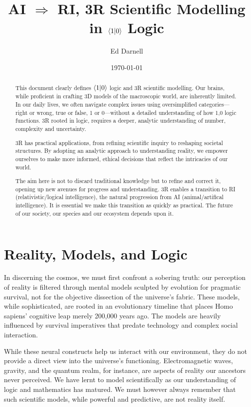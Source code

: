 \documentclass[12pt]{article}
\title{AI \(\Rightarrow\) RI, 3R Scientific Modelling in \(\langle 1 | 0 \rangle\) Logic}
\author{Ed Darnell}
\date{\today}
\begin{document}
\maketitle
\begin{abstract}
    This document clearly defines \(\langle 1 | 0 \rangle\) logic and 3R scientific modelling. Our brains, while proficient in crafting 3D models of the macroscopic world, are inherently limited. In our daily lives, we often navigate complex issues using oversimplified categories—right or wrong, true or false, 1 or 0—without a detailed understanding of how 1,0 logic functions. 3R rooted in \qbit{} logic, requires a deeper, analytic understanding of number, complexity and uncertainty.

    3R has practical applications, from refining scientific inquiry to reshaping societal structures. By adopting an analytic approach to understanding reality, we empower ourselves to make more informed, ethical decisions that reflect the intricacies of our world.

    The aim here is not to discard traditional knowledge but to refine and correct it, opening up new avenues for progress and understanding. 3R enables a transition to RI (relativistic/logical intelligence), the natural progression from AI (animal/artifical intelligence). It is essential we make this transition as quickly as practical. The future of our society, our species and our ecosystem depends upon it.
\end{abstract}
\section*{Reality, Models, and Logic}
In discerning the cosmos, we must first confront a sobering truth: our perception of reality is filtered through mental models sculpted by evolution for pragmatic survival, not for the objective dissection of the universe's fabric. These models, while sophisticated, are rooted in an evolutionary timeline that places Homo sapiens' cognitive leap merely 200,000 years ago. The models are heavily influenced by survival imperatives that predate technology and complex social interaction.

While these neural constructs help us interact with our environment, they do not provide a direct view into the universe's functioning. Electromagnetic waves, gravity, and the quantum realm, for instance, are aspects of reality our ancestors never perceived. We have lernt to model scientifically as our understanding of logic and mathematics has matured. We must however always remember that such scientific models, while powerful and predictive, are not reality itself.
\end{document}
